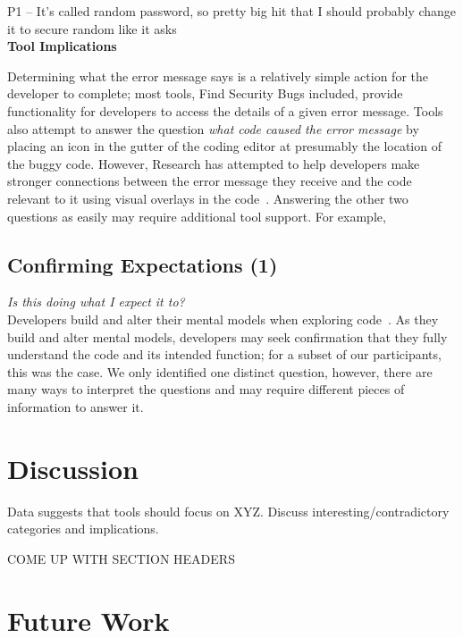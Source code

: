 \documentclass[conference]{IEEEtran}
\begin{document}
P1 -- It's called random password, so pretty big hit that I should probably change it to secure random like it asks
\\

\noindent\textbf{Tool Implications}

Determining what the error message says is a relatively simple action for the developer to complete; most tools, Find Security Bugs included, provide functionality for developers to access the details of a given error message. 
Tools also attempt to answer the question \emph{what code caused the error message} by placing an icon in the gutter of the coding editor at presumably the location of the buggy code. 
However, 
Research has attempted to help developers make stronger connections between the error message they receive and the code relevant to it using visual overlays in the code~\cite{barik14visual}.
Answering the other two questions as easily may require additional tool support. For example, 



\noindent\subsection{\textbf{Confirming Expectations (1)}}\label{ce}

\noindent\emph{Is this doing what I expect it to?} \\
Developers build and alter their mental models when exploring code~\cite{canas1994mental, burkhardt1997mental}. 
As they build and alter mental models, developers may seek confirmation that they fully understand the code and its intended function; for a subset of our participants, this was the case. 
We only identified one distinct question, however, there are many ways to interpret the questions and may require different pieces of information to answer it.

\section{Discussion}
\label{sec:disc}
Data suggests that tools should focus on XYZ. Discuss interesting/contradictory categories and implications.

COME UP WITH SECTION HEADERS


\section{Future Work}
\label{sec:fw}
\end{document}
